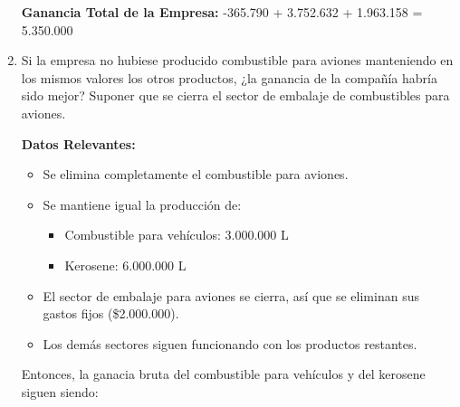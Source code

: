 \documentclass[10pt,a4paper]{article}
\begin{document}
\begin{enumerate}
    \vspace{0.5em}

    \textbf{Ganancia Total de la Empresa: } -365.790 + 3.752.632 + 1.963.158 = 5.350.000

    \item Si la empresa no hubiese producido combustible para aviones manteniendo en los mismos valores los otros
    productos, ¿la ganancia de la compañía habría sido mejor? Suponer que se cierra el sector de embalaje de
    combustibles para aviones. 

    \vspace{0.5em}

    \textbf{Datos Relevantes:}

    \begin{itemize}

        \item Se elimina completamente el combustible para aviones.
        \item Se mantiene igual la producción de:
        
        \begin{itemize}

            \item Combustible para vehículos: 3.000.000 L
            \item Kerosene: 6.000.000 L
    
        \end{itemize}

        \item El sector de embalaje para aviones se cierra, así que se eliminan sus gastos fijos (\$2.000.000).
        \item Los demás sectores siguen funcionando con los productos restantes. \\

    \end{itemize}

    Entonces, la ganacia bruta del combustible para vehículos y del kerosene siguen siendo: \\

    \begin{center}
    \end{center}


\end{enumerate}
\end{document}

